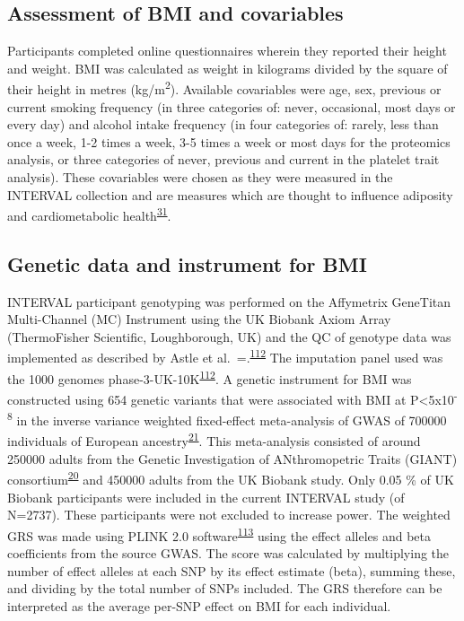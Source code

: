 \documentclass[11pt,twoside]{bristolthesis}
\begin{document}
\hypertarget{assessment-of-bmi-and-covariables}{%
\subsection{Assessment of BMI and covariables}\label{assessment-of-bmi-and-covariables}}

Participants completed online questionnaires wherein they reported their height and weight. BMI was calculated as weight in kilograms divided by the square of their height in metres (kg/m\textsuperscript{2}). Available covariables were age, sex, previous or current smoking frequency (in three categories of: never, occasional, most days or every day) and alcohol intake frequency (in four categories of: rarely, less than once a week, 1-2 times a week, 3-5 times a week or most days for the proteomics analysis, or three categories of never, previous and current in the platelet trait analysis). These covariables were chosen as they were measured in the INTERVAL collection and are measures which are thought to influence adiposity and cardiometabolic health\textsuperscript{\protect\hyperlink{ref-Bell2018a}{31}}.

\hypertarget{genetic-data-and-instrument-for-bmi}{%
\subsection{Genetic data and instrument for BMI}\label{genetic-data-and-instrument-for-bmi}}

INTERVAL participant genotyping was performed on the Affymetrix GeneTitan Multi-Channel (MC) Instrument using the UK Biobank Axiom Array (ThermoFisher Scientific, Loughborough, UK) and the QC of genotype data was implemented as described by Astle et al.~=.\textsuperscript{\protect\hyperlink{ref-Astle2016}{112}} The imputation panel used was the 1000 genomes phase-3-UK-10K\textsuperscript{\protect\hyperlink{ref-Astle2016}{112}}. A genetic instrument for BMI was constructed using 654 genetic variants that were associated with BMI at P\textless5x10\textsuperscript{-8} in the inverse variance weighted fixed-effect meta-analysis of GWAS of 700000 individuals of European ancestry\textsuperscript{\protect\hyperlink{ref-Yengo2018}{21}}. This meta-analysis consisted of around 250000 adults from the Genetic Investigation of ANthromopetric Traits (GIANT) consortium\textsuperscript{\protect\hyperlink{ref-Locke2015}{20}} and 450000 adults from the UK Biobank study. Only 0.05 \% of UK Biobank participants were included in the current INTERVAL study (of N=2737). These participants were not excluded to increase power. The weighted GRS was made using PLINK 2.0 software\textsuperscript{\protect\hyperlink{ref-Purcell2007a}{113}} using the effect alleles and beta coefficients from the source GWAS. The score was calculated by multiplying the number of effect alleles at each SNP by its effect estimate (beta), summing these, and dividing by the total number of SNPs included. The GRS therefore can be interpreted as the average per-SNP effect on BMI for each individual.
\end{document}
